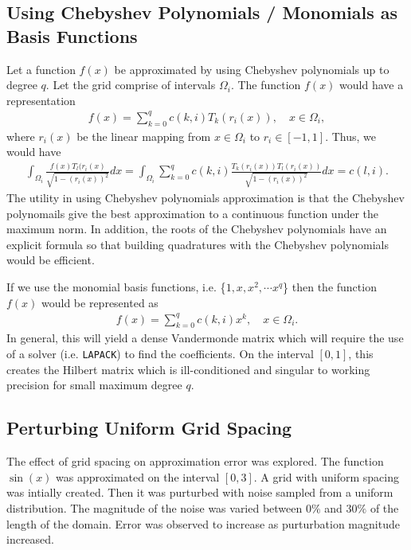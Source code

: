 \documentclass{article}
\begin{document}
\subsection{Using Chebyshev Polynomials / Monomials as Basis Functions}
Let a function $f(x)$ be approximated by using Chebyshev polynomials up to degree $q$. Let the grid comprise of intervals $\Omega_{i}$. The function $f(x)$ would have a representation
\begin{align*}
    f(x) = \sum_{k=0}^{q} c(k,i) T_{k}(r_{i}(x)), \quad x \in \Omega_{i},
\end{align*}
where $r_{i}(x)$ be the linear mapping from $x \in \Omega_{i}$ to $r_{i} \in [-1,1]$. Thus, we would have
\begin{align*}
    \int_{\Omega_{i}} \frac{f(x) T_{l}(r_{i}(x)}{\sqrt{1 - (r_{i}(x))^{2}}} dx = \int_{\Omega_{i}} \sum_{k=0}^{q} c(k,i) \frac{T_{k}(r_{i}(x)) T_{l}(r_{i}(x))}{\sqrt{1 - (r_{i}(x))^{2}}} dx = c(l,i).
\end{align*}
The utility in using Chebyshev polynomials approximation is that the Chebyshev polynomails give the best approximation to a continuous function under the maximum norm. In addition, the roots of the Chebyshev polynomials have an explicit formula so that building quadratures with the Chebyshev polynomials would be efficient. \newline

\noindent If we use the monomial basis functions, i.e. \{$1, x, x^{2}, \cdots x^{q}$\} then the function $f(x)$ would be represented as 
\begin{align*}
    f(x) =  \sum_{k=0}^{q} c(k,i) x^{k}, \quad x \in \Omega_{i}.
\end{align*}
In general, this will yield a dense Vandermonde matrix which will require the use of a solver (i.e. \verb|LAPACK|) to find the coefficients. On the interval $[0,1]$, this creates the Hilbert matrix which is ill-conditioned and singular to working precision for small maximum degree $q$. \newline

\subsection{Perturbing Uniform Grid Spacing}

The effect of grid spacing on approximation error was explored. The function $\sin(x)$ was approximated on the interval $[0,3]$. A grid with uniform spacing was intially created. Then it was purturbed with noise sampled from a uniform distribution. The magnitude of the noise was varied between $0\%$ and $30\%$ of the length of the domain. Error was observed to increase as purturbation magnitude increased. 
\end{document}
